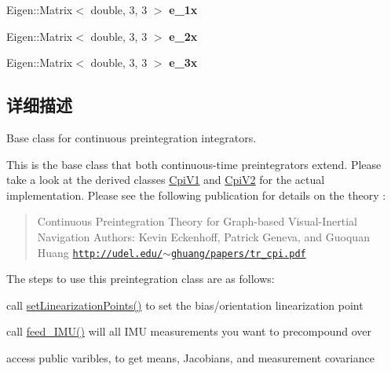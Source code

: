 \begin{DoxyCompactItemize}
\item 
\mbox{\label{classov__core_1_1CpiBase_a37d297cce43fb6cec20a2ee3ee8a7d51}} 
Eigen\+::\+Matrix$<$ double, 3, 3 $>$ {\bfseries e\+\_\+1x}
\item 
\mbox{\label{classov__core_1_1CpiBase_adf133215dc6e35fdeec0c6d448aafc94}} 
Eigen\+::\+Matrix$<$ double, 3, 3 $>$ {\bfseries e\+\_\+2x}
\item 
\mbox{\label{classov__core_1_1CpiBase_a6f34ad2753e4e7b1abc0ef7f4bdca2b5}} 
Eigen\+::\+Matrix$<$ double, 3, 3 $>$ {\bfseries e\+\_\+3x}
\end{DoxyCompactItemize}


\subsection{详细描述}
Base class for continuous preintegration integrators. 

This is the base class that both continuous-\/time preintegrators extend. Please take a look at the derived classes \hyperlink{classov__core_1_1CpiV1}{Cpi\+V1} and \hyperlink{classov__core_1_1CpiV2}{Cpi\+V2} for the actual implementation. Please see the following publication for details on the theory \cite{Eckenhoff2019IJRR} \+: \begin{quote}
Continuous Preintegration Theory for Graph-\/based Visual-\/\+Inertial Navigation Authors\+: Kevin Eckenhoff, Patrick Geneva, and Guoquan Huang \href{http://udel.edu/~ghuang/papers/tr_cpi.pdf}{\tt http\+://udel.\+edu/$\sim$ghuang/papers/tr\+\_\+cpi.\+pdf} \end{quote}


The steps to use this preintegration class are as follows\+:
\begin{DoxyEnumerate}
\item call \hyperlink{classov__core_1_1CpiBase_a32c11e3e61dc8a524bf48a18504b5417}{set\+Linearization\+Points()} to set the bias/orientation linearization point
\item call \hyperlink{classov__core_1_1CpiBase_af3b192b968d702b484a672a5557bea13}{feed\+\_\+\+I\+M\+U()} will all I\+MU measurements you want to precompound over
\item access public varibles, to get means, Jacobians, and measurement covariance 
\end{DoxyEnumerate}

